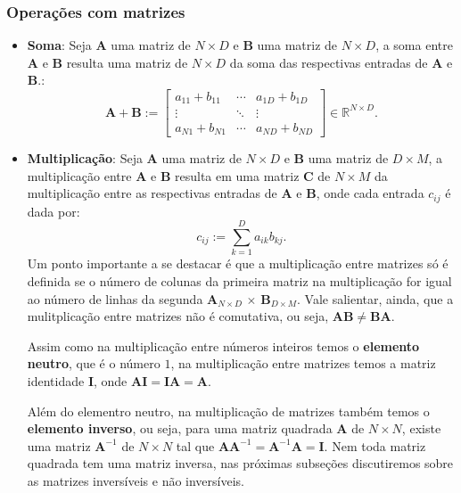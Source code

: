 \subsubsection{Operações com matrizes}

\begin{itemize}
    \item \textbf{Soma}: Seja $\mathbf{A}$ uma matriz de $N \times D$ e $\mathbf{B}$ uma matriz de $N \times D$, a soma entre $\mathbf{A}$ e $\mathbf{B}$ resulta uma matriz de $N \times D$ da soma das respectivas entradas de $\mathbf{A}$ e $\mathbf{B}$.:
    \[ 
        \mathbf{A} + \mathbf{B} := 
        \begin{bmatrix}
            a_{11} + b_{11} & \cdots & a_{1D} + b_{1D} \\
            \vdots & \ddots & \vdots \\
            a_{N1} + b_{N1} & \cdots & a_{ND} + b_{ND}
        \end{bmatrix}
        \in \mathbb{R}^{N \times D}.
    \]

    \item \textbf{Multiplicação}: Seja $\mathbf{A}$ uma matriz de $N \times D$ e $\mathbf{B}$ uma matriz de $D \times M$, a multiplicação entre $\mathbf{A}$ e $\mathbf{B}$ resulta em uma matriz $\mathbf{C}$ de $N \times M$ da multiplicação entre as respectivas entradas de $\mathbf{A}$ e $\mathbf{B}$, onde cada entrada $c_{ij}$ é dada por:
    \[
        c_{ij} := \sum_{k=1}^{D} a_{ik} b_{kj}.
    \]
    Um ponto importante a se destacar é que a multiplicação entre matrizes só é definida se o número de colunas da primeira matriz na multiplicação for igual ao número de linhas da segunda $\mathbf{A}_{N\times D}$ $\times$ $\mathbf{B}_{D\times M}$. Vale salientar, ainda, que a mulitplicação entre matrizes não é comutativa, ou seja, $\mathbf{AB} \neq \mathbf{BA}$. 
    
    Assim como na multiplicação entre números inteiros temos o \textbf{elemento neutro}, que é o número $1$, na multiplicação entre matrizes temos a matriz identidade $\mathbf{I}$, onde $\mathbf{AI} = \mathbf{IA} = \mathbf{A}$.

    Além do elementro neutro, na multiplicação de matrizes também temos o \textbf{elemento inverso}, ou seja, para uma matriz quadrada $\mathbf{A}$ de $N \times N$, existe uma matriz $\mathbf{A}^{-1}$ de $N \times N$ tal que $\mathbf{AA}^{-1} = \mathbf{A}^{-1}\mathbf{A} = \mathbf{I}$. Nem toda matriz quadrada tem uma matriz inversa, nas próximas subseções discutiremos sobre as matrizes inversíveis e não inversíveis.


\end{itemize}
